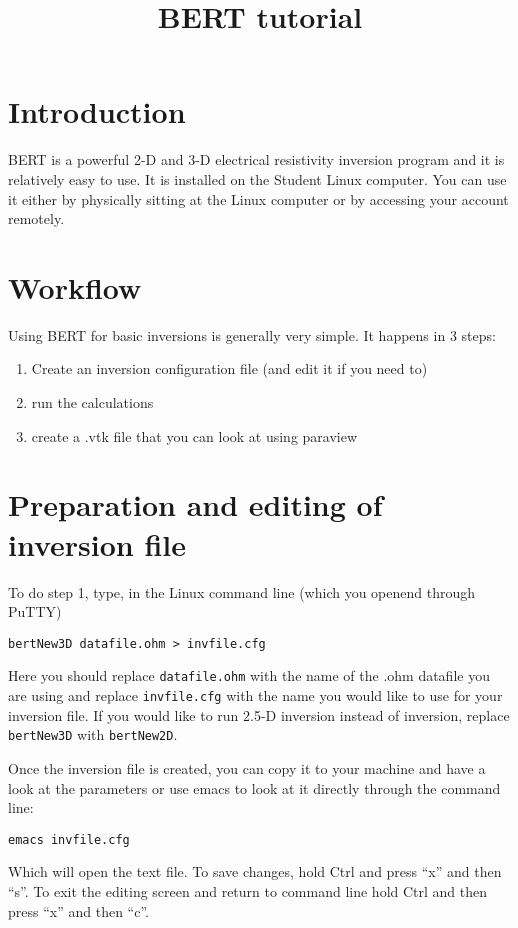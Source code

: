 \documentclass[11pt]{article}
\title{BERT tutorial}
\begin{document}
\maketitle

\section{Introduction}
BERT is a powerful 2-D and 3-D electrical resistivity inversion
program and it is relatively easy to use. It is installed on the
Student Linux computer.  You can use it either by physically sitting
at the Linux computer or by accessing your account remotely.


\section{Workflow}
Using BERT for basic inversions is generally very simple. It happens
in 3 steps:
\begin{enumerate}
\item Create an inversion configuration file (and edit it if you need to)
\item run the calculations
\item create a .vtk file that you can look at using paraview
\end{enumerate}

\section{Preparation and editing of inversion file}
To do step 1, type, in the Linux command line (which you openend
through PuTTY)

\quad \verb#bertNew3D datafile.ohm > invfile.cfg#

Here you should replace \verb#datafile.ohm# with the name of the .ohm
datafile you are using and replace \verb#invfile.cfg# with the name
you would like to use for your inversion file. If you would like to
run 2.5-D inversion instead of inversion, replace \verb#bertNew3D#
with \verb#bertNew2D#.

Once the inversion file is created, you can copy it to your machine
and have a look at the parameters or use emacs to look at it directly
through the command line:

\quad \verb#emacs invfile.cfg#

Which will open the text file. To save changes, hold Ctrl and press
``x'' and then ``s''. To exit the editing screen and return to command
line hold Ctrl and then press ``x'' and then ``c''.
\end{document}
